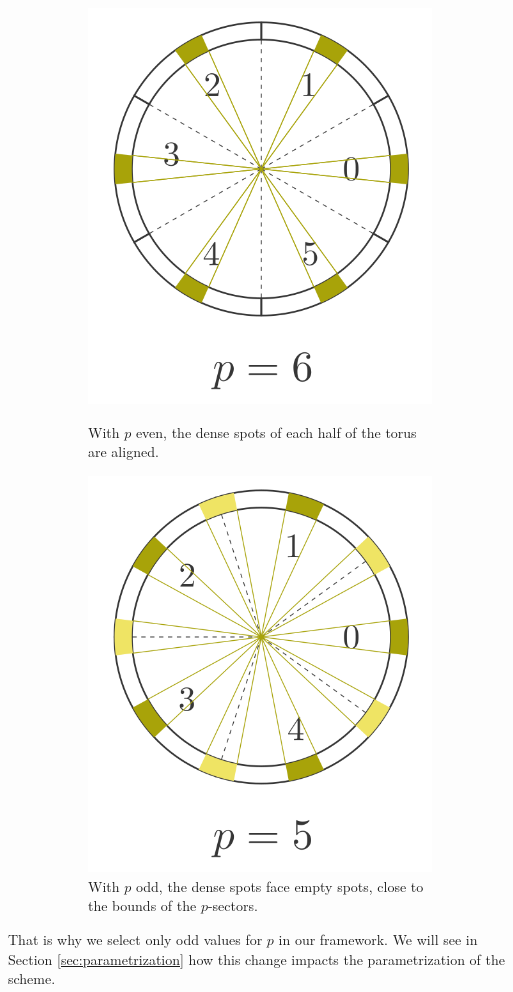 \begin{figure}
  \begin{subfigure}{0.49\linewidth}
    \    \centering
    \includegraphics[width=0.5\linewidth]{images/torus_p_even.png}
    \caption{With $p$ even, the dense spots of each half of the torus are aligned.}
    \label{fig:torus_p_even}
  \end{subfigure}\hspace{1em}%
  \begin{subfigure}{0.49\linewidth}
    \centering
    \includegraphics[width=0.5\linewidth]{images/torus_p_odd.png}
    \caption{With $p$ odd, the dense spots face empty spots, close to the bounds of the $p$-sectors.}
  \end{subfigure}
  \caption{}
  \label{fig:torus_p_even_vs_odd}
\end{figure}



That is why we select only odd values for $p$ in our framework. We will see in Section \ref{sec:parametrization} how this change impacts the parametrization of the scheme.



